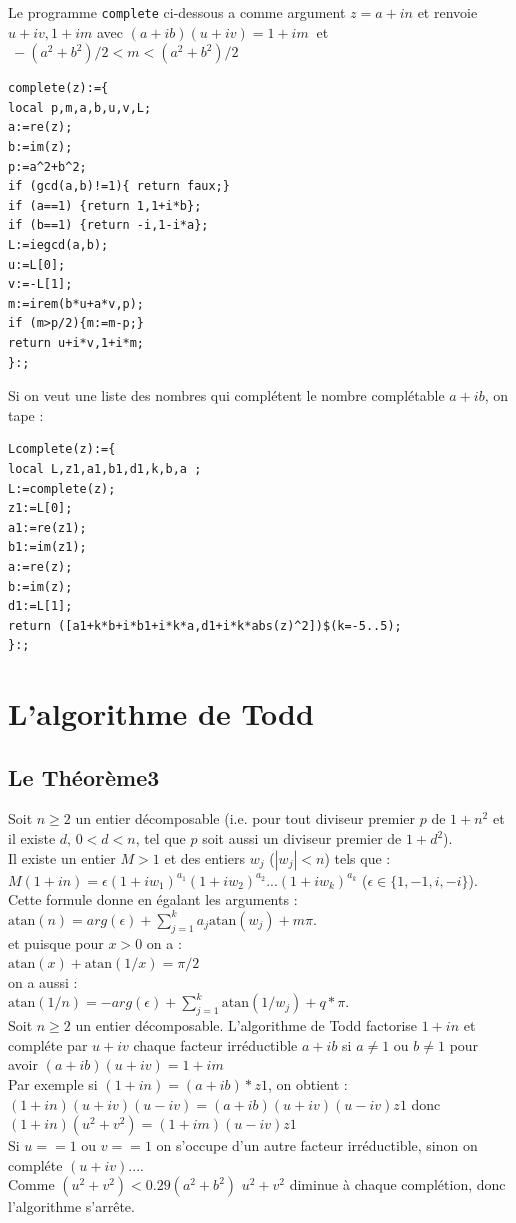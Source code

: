 \documentclass[a4paper,11pt]{book}
\newcommand{\atan}{\mbox{atan}}
\begin{document}
Le programme {\tt complete} ci-dessous a comme argument $z=a+in$ et
renvoie $u+iv,1+im$ avec 
$(a+ib)(u+iv)=1+im\ $  et $\ -(a^2+b^2)/2<m<(a^2+b^2)/2$
\begin{verbatim}
complete(z):={
local p,m,a,b,u,v,L;
a:=re(z);
b:=im(z);
p:=a^2+b^2;
if (gcd(a,b)!=1){ return faux;}
if (a==1) {return 1,1+i*b};
if (b==1) {return -i,1-i*a};
L:=iegcd(a,b);
u:=L[0];
v:=-L[1];
m:=irem(b*u+a*v,p);
if (m>p/2){m:=m-p;}
return u+i*v,1+i*m;
}:;
\end{verbatim}
Si on veut une liste des nombres qui compl\'etent le nombre compl\'etable 
$a+ib$, on tape :
\begin{verbatim}
Lcomplete(z):={
local L,z1,a1,b1,d1,k,b,a ;
L:=complete(z);
z1:=L[0];
a1:=re(z1);
b1:=im(z1);
a:=re(z);
b:=im(z);
d1:=L[1];
return ([a1+k*b+i*b1+i*k*a,d1+i*k*abs(z)^2])$(k=-5..5);
}:;
\end{verbatim}
\section{L'algorithme de Todd}\label{sec:Todd}
\subsection{Le Th\'eor\`eme3}
Soit $n\geq 2$ un entier d\'ecomposable (i.e. pour tout diviseur premier $p$ de 
$1+n^2$ et il existe $d$,  $0<d<n$, tel que $p$ soit aussi un diviseur 
premier de $1+d^2$).\\
Il existe un entier $M>1$ et des entiers $w_j$ ($|w_j|<n$) tels que :\\
$M(1+in)=\epsilon(1+iw_1)^{a_1}(1+iw_2)^{a_2}...(1+iw_k)^{a_k}$ ($\epsilon \in \{1,-1,i,-i\}$).\\
Cette formule donne en \'egalant les arguments :\\
$\atan(n)=arg(\epsilon)+\sum_{j=1}^ka_j\atan(w_j)+m\pi$.\\
et puisque pour $x>0$ on a :\\
$\atan(x)+\atan(1/x)=\pi/2$\\
on a aussi :\\
$\atan(1/n)=-arg(\epsilon)+\sum_{j=1}^k\atan(1/w_j)+q*\pi$.\\

Soit $n\geq 2$ un entier d\'ecomposable. L'algorithme de Todd factorise
$1+in$ et compl\'ete par $u+iv$ chaque facteur irr\'eductible $a+ib$ si 
$a\neq 1$ ou $b\neq 1$ pour avoir $(a+ib)(u+iv)=1+im$\\
Par exemple si $(1+in)=(a+ib)*z1$, on obtient :\\
$(1+in)(u+iv)(u-iv)=(a+ib)(u+iv)(u-iv)z1$  donc\\
$(1+in)(u^2+v^2)=(1+im)(u-iv)z1$\\
Si $u==1$ ou $v==1$ on s'occupe d'un autre facteur irr\'eductible, sinon
on compl\'ete $(u+iv)$....\\
Comme $(u^2+v^2)<0.29(a^2+b^2)$ $u^2+v^2$ diminue \`a chaque compl\'etion, donc 
l'algorithme s'arr\^ete.\\
\end{document}
